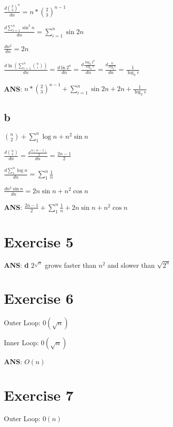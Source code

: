 \documentclass[
]{article}
\begin{document}
\(\frac{d{\binom{2}{3}^n}}{dn} = n *\binom{2}{3}^{n-1}\)

\(\frac{d{\sum_{i=1}^n{\sin^2 n}}}{dn} = \sum_{i=1}^n{\sin2n}\)

\(\frac{dn^2}{dn} = 2n\)

\(\frac{d{\ln{(\sum_{i=1}^n{\binom{n}{i}})}}}{dn} = \frac{d{\ln{2^n}}}{dn} = \frac{d{\frac{\log_{2}{{2}^{n}}}{\log_2e}}}{dn} = \frac{d{\frac{n}{log_2e}}}{dn} = \frac{1}{\log_2e}\)

\textbf{ANS}:
\(n *\binom{2}{3}^{n-1}+\sum_{i=1}^n{\sin2n}+2n+\frac{1}{\log_2e}\)

\hypertarget{b-3}{%
\subsection{b}\label{b-3}}

\(\binom{n}{2}+\sum_{1}^n{\log n}+n^2{\sin n}\)

\(\frac{d\binom{n}{2}}{dn} = \frac{d{\frac{n(n-1)}{2}}}{dn} = \frac{2n-1}{2}\)

\(\frac{d\sum_{1}^n{\log n}}{dn} = \sum_{1}^n{\frac{1}{n}}\)

\(\frac{dn^2{\sin n}}{dn} = 2n{\sin n}+n^2{\cos n}\)

\textbf{ANS}:
\(\frac{2n-1}{2} + \sum_{1}^n{\frac{1}{n}} +2n{\sin n}+n^2{\cos n}\)

\hypertarget{exercise-5}{%
\section{Exercise 5}\label{exercise-5}}

\textbf{ANS}: \textbf{d} \(2^{\sqrt{n}}\) grows faster than \(n^2\) and
slower than \(\sqrt{2^n}\)

\hypertarget{exercise-6}{%
\section{Exercise 6}\label{exercise-6}}

Outer Loop: \(0(\sqrt{n})\)

Inner Loop: \(0(\sqrt{n})\)

\textbf{ANS}: \(O(n)\)

\hypertarget{exercise-7}{%
\section{Exercise 7}\label{exercise-7}}

Outer Loop: \(0({n})\)
\end{document}
